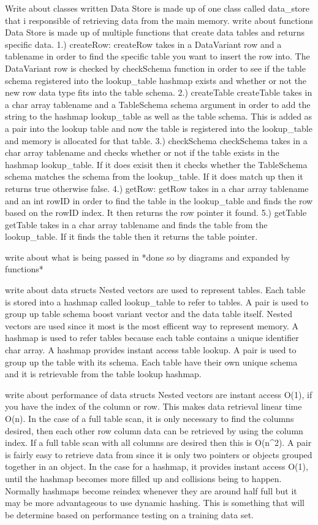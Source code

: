 \documentclass[letterpaper, 12pt]{article}
\begin{document}
Write about classes written
	Data Store is made up of one class called data\_store that i responsible of retrieving
	data from the main memory.
write about functions
	Data Store is made up of multiple functions that create data tables and returns specific data.
1.) createRow:
		createRow takes in a DataVariant row and a tablename in order to find the specific table
		you want to insert the row into. The DataVariant row is checked by checkSchema function in
		order to see if the table schema registered into the lookup\_table hashmap exists and whether
		or not the new row data type fits into the table schema.
2.) createTable
		createTable takes in a char array tablename and a TableSchema schema argument in order to add
		the string to the hashmap lookup_table as well as the table schema. This is added as a pair
		into the lookup table and now the table is registered into the lookup\_table and memory is allocated
		for that table.
3.) checkSchema
		checkSchema takes in a char array tablename and checks whether or not if the table exists in the
		hashmap lookup_table. If it does exisit then it checks whether the TableSchema schema matches the
		schema from the lookup\_table. If it does match up then it returns true otherwise false.
4.) getRow:
		getRow takes in a char array tablename and an int rowID in order to find the table in the lookup_table
		and finds the row based on the rowID index. It then returns the row pointer it found.
5.) getTable
		getTable takes in a char array tablename and finds the table from the lookup\_table. If it finds the table
		then it returns the table pointer.

write about what is being passed in
*done so by diagrams and expanded by functions*

write about data structs
	Nested vectors are used to represent tables. Each table is stored into a hashmap called lookup_table to refer to
	tables. A pair is used to group up table schema boost variant vector and the data table itself. Nested vectors
	are used since it most is the most efficent way to represent memory. A hashmap is used to refer tables because each
	table contains a unique identifier char array. A hashmap provides instant access table lookup. A pair is used to group
	up the table with its schema. Each table have their own unique schema and it is retrievable from the table lookup hashmap.

write about performance of data structs
	Nested vectors are instant access O(1), if you have the index of the column or row. This makes data retrieval
	linear time O(n). In the case of a full table scan, it is only necessary to find the columns desired, then each other row
	column data can be retrieved by using the column index. If a full table scan with all columns are desired then this is O(n^2).
	A pair is fairly easy to retrieve data from since it is only two pointers or objects grouped together in an object. In the case
	for a hashmap, it provides instant access O(1), until the hashmap becomes more filled up and collisions being to happen. Normally hashmaps
	become reindex whenever they are around half full but it may be more advantageous to use dynamic hashing. This is something that will be determine based on performance testing on a training data set.
\end{document}
